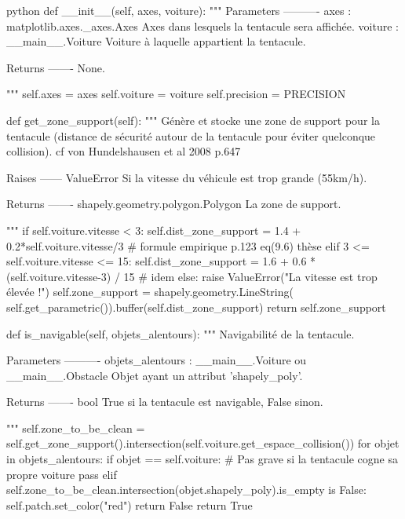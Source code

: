 \begin{mintedbox}{python}
    def __init__(self, axes, voiture):
        """
        Parameters
        ----------
        axes : matplotlib.axes._axes.Axes
            Axes dans lesquels la tentacule sera affichée.
        voiture : __main__.Voiture
            Voiture à laquelle appartient la tentacule.

        Returns
        -------
        None.

        """
        self.axes = axes
        self.voiture = voiture
        self.precision = PRECISION

    def get_zone_support(self):
        """
        Génère et stocke une zone de support pour la tentacule (distance de sécurité autour de la tentacule pour éviter quelconque collision).
        cf von Hundelshausen et al 2008 p.647

        Raises
        ------
        ValueError
            Si la vitesse du véhicule est trop grande (55km/h).

        Returns
        -------
        shapely.geometry.polygon.Polygon
            La zone de support.

        """
        if self.voiture.vitesse < 3:
            self.dist_zone_support = 1.4 + 0.2*self.voiture.vitesse/3  # formule empirique p.123 eq(9.6) thèse
        elif 3 <= self.voiture.vitesse <= 15:
            self.dist_zone_support = 1.6 + 0.6 * (self.voiture.vitesse-3) / 15  # idem
        else:
            raise ValueError("La vitesse est trop élevée !")
        self.zone_support = shapely.geometry.LineString( self.get_parametric()).buffer(self.dist_zone_support)
        return self.zone_support

    def is_navigable(self, objets_alentours):
        """
        Navigabilité de la tentacule.

        Parameters
        ----------
        objets_alentours : __main__.Voiture ou __main__.Obstacle
            Objet ayant un attribut 'shapely_poly'.

        Returns
        -------
        bool
            True si la tentacule est navigable, False sinon.

        """
        self.zone_to_be_clean = self.get_zone_support().intersection(self.voiture.get_espace_collision())
        for objet in objets_alentours:
            if objet == self.voiture:  # Pas grave si la tentacule cogne sa propre voiture
                pass
            elif self.zone_to_be_clean.intersection(objet.shapely_poly).is_empty is False:
                self.patch.set_color("red")
                return False
        return True



\end{mintedbox}
